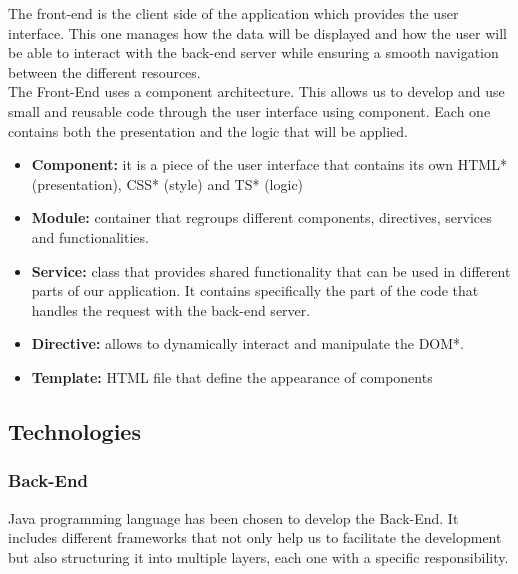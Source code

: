 \documentclass[12pt,a4paper,table,english]{article}
\begin{document}
	The front-end is the client side of the application which provides the user interface. This one manages how the data will be displayed and how the user will be able to interact with the back-end server while ensuring a smooth navigation between the different resources. \\
	
	\noindent The Front-End uses a component architecture. This allows us to develop and use small and reusable code through the user interface using component. Each one contains both the presentation and the logic that will be applied.
	
	\begin{itemize}
		\item \textbf{Component:} it is a piece of the user interface that contains its own HTML* (presentation), CSS* (style) and TS* (logic)
		
		\item \textbf{Module:} container that regroups different components, directives, services and functionalities.
		
		\item \textbf{Service:} class that provides shared functionality that can be used in different parts of our application. It contains specifically the part of the code that handles the request with the back-end server.
		
		\item \textbf{Directive:} allows to dynamically interact and manipulate the DOM*. %
		
		\item \textbf{Template:} HTML file that define the appearance of components
	\end{itemize}

	\newpage
	
	\subsection{Technologies}
	
	\subsubsection{Back-End}
	
	Java programming language has been chosen to develop the Back-End. It includes different frameworks that not only help us to facilitate the development but also structuring it into multiple layers, each one with a specific responsibility.
	
\end{document}
